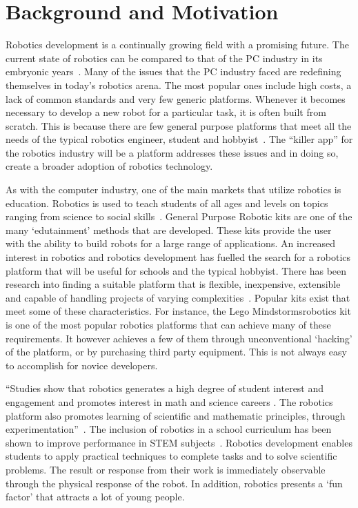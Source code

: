 \chapter{Background and Motivation} %
\label{cha:background_and_motivation}

Robotics development is a continually growing field with a promising future. The
current state of robotics can be compared to that of the PC industry in its
embryonic years~\parencite{billgates}. Many of the issues that the PC industry faced are redefining
themselves in today's robotics arena. The most popular ones include high costs, a lack
of common standards and very few generic platforms. Whenever it becomes necessary to
develop a new robot for a particular task, it is often built from scratch. 
This is because there are few general purpose platforms that meet
all the needs of the typical robotics engineer, student and hobbyist~\parencite{r2p}. The
``killer app'' for the robotics industry will be a platform addresses these issues
and in doing so, create a broader adoption of robotics technology. 

As with the computer industry, one of the main markets that utilize robotics is education.
Robotics is used to teach students of all ages and levels on topics ranging from
science to social skills~\parencite{kramer}. General Purpose Robotic kits are one of the many
`edutainment' methods that are developed. These kits provide the user with the
ability to build robots for a large range of applications. An increased interest in 
robotics and robotics development has fuelled 
the search for a robotics platform that will be useful for schools and the 
typical hobbyist. There has been research into finding a suitable
platform that is flexible, inexpensive, extensible and capable of handling
projects of varying complexities~\parencite{bot-mate}. Popular kits exist that meet some of
these characteristics. For instance, the Lego Mindstorms\texttrademark  robotics
kit is one of the most popular robotics platforms that can achieve many of these
requirements. It however achieves a few of them through unconventional
`hacking' of the platform, or by purchasing third party equipment. This is not
always easy to accomplish for novice developers. 

``Studies show that robotics generates a high degree of student interest and engagement and
promotes interest in math and science careers .  The robotics platform also promotes learning 
of scientific and mathematic principles, through experimentation''~\parencite{barker}.
The  inclusion of robotics in a school curriculum has been
shown to improve performance in STEM subjects~\parencite{school}. 
Robotics development enables students to apply practical techniques to complete tasks and 
to solve scientific problems. The result or response from their work is
immediately observable through the physical response of the robot. In addition,
robotics  presents a `fun factor' that attracts a lot of young people.

